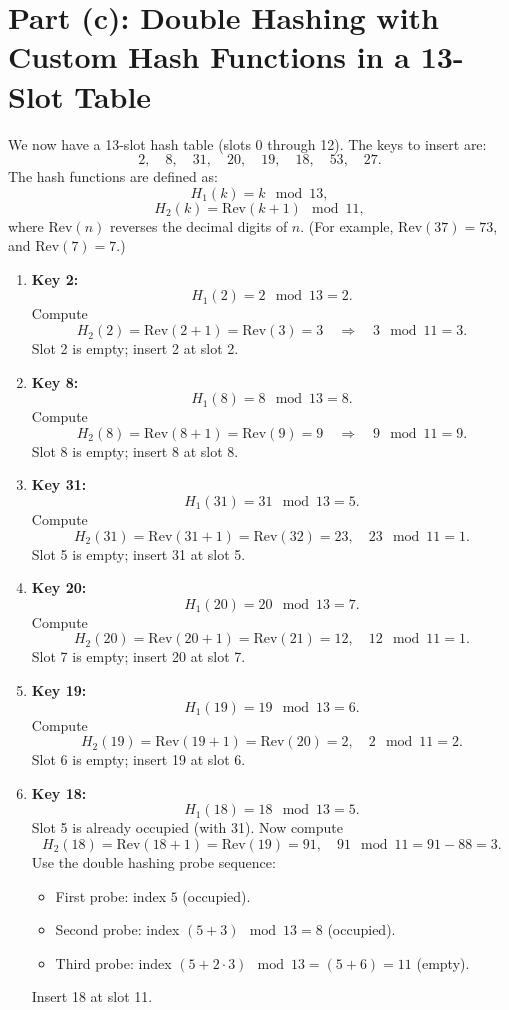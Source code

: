 \documentclass{article}
\begin{document}
\section*{Part (c): Double Hashing with Custom Hash Functions in a 13-Slot Table}

We now have a 13-slot hash table (slots 0 through 12). The keys to insert are:
\[
2,\quad 8,\quad 31,\quad 20,\quad 19,\quad 18,\quad 53,\quad 27.
\]
The hash functions are defined as:
\[
H_1(k)= k \mod 13,
\]
\[
H_2(k)= \text{Rev}(k+1) \mod 11,
\]
where $\text{Rev}(n)$ reverses the decimal digits of $n$. (For example, $\text{Rev}(37)=73$, and $\text{Rev}(7)=7$.)

\begin{enumerate}[label=\textbf{Step \arabic*:}, leftmargin=1.8cm]
    \item \textbf{Key 2:} 
    \[
    H_1(2)=2 \mod 13 = 2.
    \]
    Compute 
    \[
    H_2(2)=\text{Rev}(2+1)=\text{Rev}(3)=3 \quad \Rightarrow\quad 3 \mod 11=3.
    \]
    Slot 2 is empty; insert 2 at slot 2.
    
    \item \textbf{Key 8:} 
    \[
    H_1(8)=8 \mod 13 = 8.
    \]
    Compute 
    \[
    H_2(8)=\text{Rev}(8+1)=\text{Rev}(9)=9 \quad \Rightarrow\quad 9 \mod 11=9.
    \]
    Slot 8 is empty; insert 8 at slot 8.
    
    \item \textbf{Key 31:} 
    \[
    H_1(31)=31 \mod 13 = 5.
    \]
    Compute 
    \[
    H_2(31)=\text{Rev}(31+1)=\text{Rev}(32)=23,\quad 23 \mod 11 = 1.
    \]
    Slot 5 is empty; insert 31 at slot 5.
    
    \item \textbf{Key 20:} 
    \[
    H_1(20)=20 \mod 13 = 7.
    \]
    Compute 
    \[
    H_2(20)=\text{Rev}(20+1)=\text{Rev}(21)=12,\quad 12 \mod 11 = 1.
    \]
    Slot 7 is empty; insert 20 at slot 7.
    
    \item \textbf{Key 19:} 
    \[
    H_1(19)=19 \mod 13 = 6.
    \]
    Compute 
    \[
    H_2(19)=\text{Rev}(19+1)=\text{Rev}(20)=2,\quad 2 \mod 11=2.
    \]
    Slot 6 is empty; insert 19 at slot 6.
    
    \item \textbf{Key 18:} 
    \[
    H_1(18)=18 \mod 13 = 5.
    \]
    Slot 5 is already occupied (with 31). Now compute 
    \[
    H_2(18)=\text{Rev}(18+1)=\text{Rev}(19)=91,\quad 91 \mod 11 = 91-88=3.
    \]
    Use the double hashing probe sequence:
    \begin{itemize}
        \item First probe: index \(5\) (occupied).
        \item Second probe: index \( (5+3) \mod 13 = 8\) (occupied).
        \item Third probe: index \( (5+2\cdot3) \mod 13 = (5+6)=11\) (empty).
    \end{itemize}
    Insert 18 at slot 11.
    

\end{enumerate}
\end{document}
